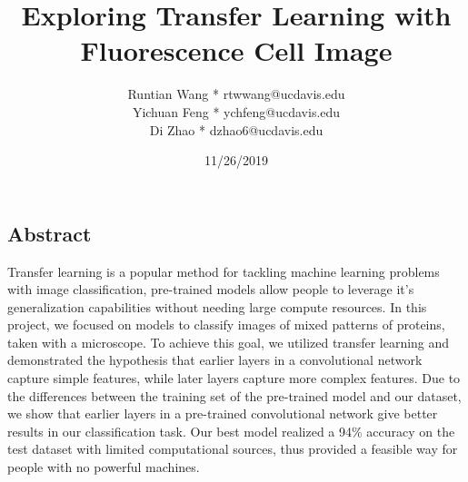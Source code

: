 \documentclass{article}
\begin{document}
\title{Exploring Transfer Learning with Fluorescence Cell Image}
\author{Runtian Wang * rtwwang@ucdavis.edu\\Yichuan Feng * ychfeng@ucdavis.edu\\Di Zhao * dzhao6@ucdavis.edu}
\date{11/26/2019}
\maketitle


\begin{centering}
  \section*{Abstract}
\end{centering}

Transfer learning is a popular method for tackling machine learning problems with image classification, 
pre-trained models allow people to leverage it's generalization capabilities without needing large compute resources. In this project, we focused on models to classify images of mixed patterns of proteins,
taken with a microscope. To achieve this goal, we utilized transfer learning and demonstrated the hypothesis that earlier layers in a convolutional network capture simple features,
while later layers capture more complex features. Due to the differences between the training set
of the pre-trained model and our dataset, we show that earlier layers in a pre-trained convolutional network
give better results in our classification task. Our best model realized a 94\% accuracy on the test dataset with limited computational sources, thus provided a feasible way for people with no powerful machines.
\\
\end{document}
